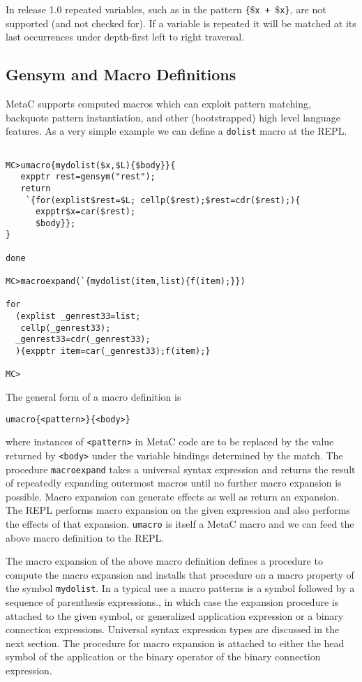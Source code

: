\documentclass{article}
\begin{document}
In release 1.0 repeated variables, such as in the pattern {\tt \{$\$$x + $\$$x\}}, are not supported (and not checked for).
If a variable is repeated it will be matched at its last occurrences under depth-first left to right traversal.

\subsection{Gensym and Macro Definitions}

MetaC supports computed macros which can exploit pattern matching, backquote pattern instantiation, and other (bootstrapped) high level language features.
As a very simple example we can define a {\tt dolist} macro at the REPL.

\begin{verbatim}

MC>umacro{mydolist($x,$L){$body}}{
   expptr rest=gensym("rest");
   return
    `{for(explist$rest=$L; cellp($rest);$rest=cdr($rest);){
      expptr$x=car($rest);
      $body}};
}

done

MC>macroexpand(`{mydolist(item,list){f(item);}})

for
  (explist _genrest33=list;
   cellp(_genrest33);
  _genrest33=cdr(_genrest33);
  ){expptr item=car(_genrest33);f(item);}

MC>
\end{verbatim}

The general form of a macro definition is
\begin{verbatim}
umacro{<pattern>}{<body>}
\end{verbatim}
where instances of {\tt <pattern>} in MetaC code are to be replaced by the value returned by {\tt <body>} under the variable bindings determined by the match.
The procedure {\tt macroexpand} takes a universal syntax expression
and returns the result of repeatedly expanding outermost macros until no further macro expansion is possible.  Macro expansion can generate effects as well as return an expansion.  The REPL performs
macro expansion on the given expression and also performs the effects of that expansion.  {\tt umacro} is itself a MetaC macro and we can feed the above macro definition to the REPL.

The macro expansion of the above macro definition defines a procedure to compute the macro expansion and installs that procedure on a macro property of the symbol {\tt mydolist}.
In a typical use a macro patterns is a symbol followed by a sequence of parenthesis expressions., in which case the expansion procedure is attached to the given symbol,
or generalized application expression or a binary connection expressions.  Universal syntax expression types are discussed in the next section.
The procedure for macro expansion is attached to either the head symbol of the application
or the binary operator of the binary connection expression.
\end{document}

